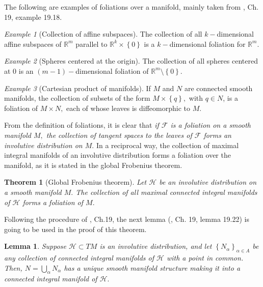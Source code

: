 \documentclass[12pt, letterpaper, reqno]{amsart}
\theoremstyle{definition}
\theoremstyle{plain}
\newtheorem{thm}{Theorem}
\newtheorem{lm}{Lemma}
\theoremstyle{remark}
\newtheorem{ex}{Example}
\begin{document}
The following are examples of foliations over a manifold, mainly taken from \cite{lee2003introduction}, Ch. 19, example 19.18.

\begin{ex}[Collection of affine subspaces]
	The collection of all $ k- $dimensional affine subspaces of $ \mathbb{R}^m $ parallel to $ \mathbb{R}^k\times \left\{ 0 \right\} $ is a $ k- $dimensional foliation for $ \mathbb{R}^m. $ 
\end{ex}

\begin{ex}[Spheres centered at the origin]
	The collection of all spheres centered at $ 0 $ is an $ (m-1)- $dimensional foliation of $ \mathbb{R}^m\setminus \left\{ 0 \right\} $. 
\end{ex}

\begin{ex}[Cartesian product of manifolds]\label{ex:product_foliation}
	If $ M $ and $ N $ are connected smooth manifolds, the collection of subsets of the form $ M\times \left\{ q \right\}, $ with $ q\in N $, is a foliation of $ M\times N, $ each of whose leaves is diffeomorphic to $ M. $  	
\end{ex}

From the definition of foliations, it is clear that \textit{if $ \mathcal{F} $ is a foliation on a smooth manifold $ M, $ the collection of tangent spaces to the leaves of $ \mathcal{F} $ forms an involutive distribution on $ M. $} In a reciprocal way, the collection of maximal integral manifolds of an involutive distribution forms a foliation over the manifold, as it is stated in the global Frobenius theorem.

\begin{thm}[Global Frobenius theorem]
	Let $ \mathcal{H} $ be an involutive distribution on a smooth manifold $ M. $ The collection of all maximal connected integral manifolds of $ \mathcal{H} $ forms a foliation of $ M. $ 
\end{thm}

Following the procedure of \cite{lee2003introduction}, Ch.19, the next lemma (\cite{lee2003introduction}, Ch. 19, lemma 19.22) is going to be used in the proof of this theorem.

\begin{lm}
	Suppose $ \mathcal{H}\subset TM $ is an involutive distribution, and let $ \left\{ N_\alpha \right\}_{\alpha\in A} $ be any collection of connected integral manifolds of $ \mathcal{H} $ with a point in common. Then, $ N=\bigcup_{\alpha} N_\alpha $ has a unique smooth manifold structure making it into a connected integral manifold of $ \mathcal{H}. $  
\end{lm}
\end{document}

